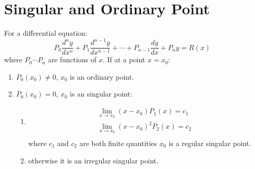 \section{Singular and Ordinary Point}
For a differential equation:
\begin{equation}
	P_0 \dfrac{d^n y}{dx^n}+P_1 \dfrac{d^{n-1}y}{dx^{n-1}}+\cdots+P_{n-1} \dfrac{dy}{dx}+P_n y=R(x)
\end{equation}
where $P_0 \cdots P_n$ are functions of $x$.\newline
If at a point $x=x_0$:
\begin{enumerate}
	\item $P_0(x_0) \neq 0$, $x_0$ is an ordinary point.
	\item $P_0(x_0)=0$, $x_0$ is an singular point: \begin{enumerate}
		\item \begin{align}
			\lim_{x\to x_0}(x-x_0)P_1(x)=c_1\\
			\lim_{x\to x_0}(x-x_0)^2P_2(x)=c_2\\
		\end{align}
		where $c_1$ and $c_2$ are both finite quantities $x_0$ is a regular singular point.
		\item otherwise it is an irregular singular point.
	\end{enumerate}
\end{enumerate}

